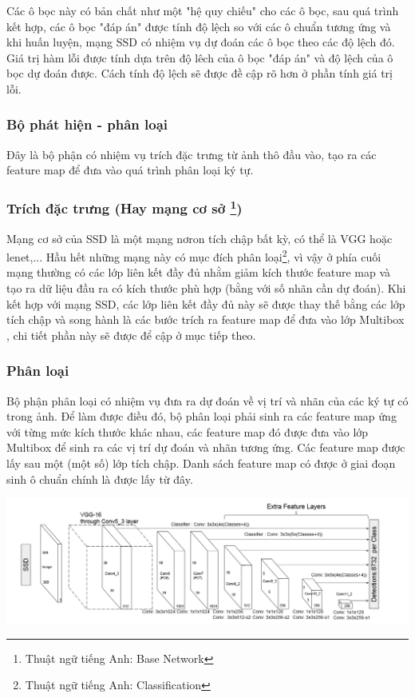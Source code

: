\documentclass[a4paper,12pt]{article}
\begin{document}
	Các ô bọc này có bản chất như một "hệ quy chiếu" cho các ô bọc, sau quá trình kết hợp, các ô bọc "đáp án" được tính độ lệch so với các ô chuẩn tương ứng và khi huấn luyện, mạng SSD\cite{liu2016ssd} có nhiệm vụ dự đoán các ô bọc theo các độ lệch đó. Giá trị hàm lỗi được tính dựa trên độ lêch của ô bọc "đáp án" và độ lệch của ô bọc dự đoán được. Cách tính độ lệch sẽ được đề cập rõ hơn ở phần tính giá trị lỗi.
	
	
	\subsubsection{Bộ phát hiện - phân loại}
	Đây là bộ phận có nhiệm vụ trích đặc trưng từ ảnh thô đầu vào, tạo ra các feature map để đưa vào quá trình phân loại ký tự.
	
	\subsubsection*{Trích đặc trưng (Hay mạng cơ sở \footnote{Thuật ngữ tiếng Anh: Base Network})}
	
	Mạng cơ sở của SSD\cite{liu2016ssd} là một mạng nơron tích chập bất kỳ, có thể là VGG\cite{Simonyan14c} hoặc lenet\cite{yanlecun},... Hầu hết những mạng này có mục đích phân loại\footnote{Thuật ngữ tiếng Anh: Classification}, vì vậy ở phía cuối mạng thường có các lớp liên kết đầy đủ nhằm giảm kích thước feature map và tạo ra dữ liệu đầu ra có kích thước phù hợp (bằng với số nhãn cần dự đoán). Khi kết hợp với mạng SSD\cite{liu2016ssd}, các lớp liên kết đầy đủ này sẽ được thay thế bằng các lớp tích chập và song hành là các bước trích ra feature map để đưa vào lớp Multibox \cite{erhan2014scalable}, chi tiết phần này sẽ được để cập ở mục tiếp theo.
	
	\subsubsection* {Phân loại}
	
	Bộ phận phân loại có nhiệm vụ đưa ra dự đoán về vị trí và nhãn của các ký tự có trong ảnh. Để làm được điều đó, bộ phân loại phải sinh ra các feature map ứng với từng mức kích thước khác nhau, các feature map đó được đưa vào lớp Multibox để sinh ra các vị trí dự đoán và nhãn tương ứng. Các feature map được lấy sau một (một số) lớp tích chập. Danh sách feature map có được ở giai đoạn sinh ô chuẩn chính là được lấy từ đây. \\
	
	\begin{center}
		
		\centering
		\includegraphics[width=0.8\linewidth]{SSD_Struture.png}
		\vspace{0.5cm}
	\end{center}
	
\end{document}
